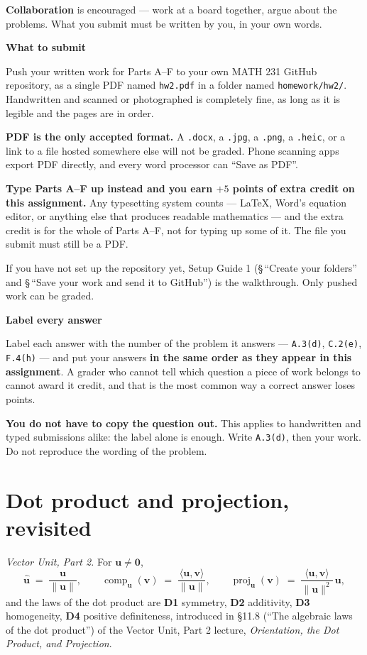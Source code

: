 \documentclass[11pt]{article}
\newcounter{prob}[section]
\newenvironment{callout}[1]
  {\par\medskip\needspace{5\baselineskip}%
   \begin{lrbox}{\qcbox}%
   \begin{minipage}{\dimexpr\textwidth-2\fboxsep-4pt}%
   \setlength{\parskip}{0.4em}%
   \textbf{\sffamily\color{RoyalBlue}#1}\par}
  {\end{minipage}\end{lrbox}%
   \begin{center}\colorbox{softbg}{\usebox{\qcbox}}\end{center}\medskip}
\newcommand{\vc}[1]{\mathbf{#1}}
\newcommand{\uv}[1]{\hat{\vc{#1}}}
\newcommand{\norm}[1]{\lVert #1\rVert}
\newcommand{\ip}[2]{\langle #1,#2\rangle}
\newcommand{\proj}[2]{\operatorname{proj}_{#1}(#2)}
\newcommand{\comp}[2]{\operatorname{comp}_{#1}(#2)}
\begin{document}
\medskip
\noindent\textbf{Collaboration} is encouraged --- work at a board together, argue
about the problems. What you submit must be written by you, in your own words.

\begin{callout}{What to submit}
Push your written work for Parts A--F to your own MATH 231 GitHub repository,
as a single PDF named \texttt{hw2.pdf} in a folder named \texttt{homework/hw2/}.
Handwritten and scanned or photographed is completely fine, as long as it is
legible and the pages are in order.

\textbf{PDF is the only accepted format.} A \texttt{.docx}, a \texttt{.jpg}, a
\texttt{.png}, a \texttt{.heic}, or a link to a file hosted somewhere else will
not be graded. Phone scanning apps export PDF directly, and every word processor
can ``Save as PDF''.

\textbf{Type Parts A--F up instead and you earn $+5$ points of extra credit on
this assignment.} Any typesetting system counts --- \LaTeX, Word's equation
editor, or anything else that produces readable mathematics --- and the extra
credit is for the whole of Parts A--F, not for typing up some of it. The file
you submit must still be a PDF.

If you have not set up the repository yet, Setup Guide 1 (\S\,``Create your
folders'' and \S\,``Save your work and send it to GitHub'') is the walkthrough.
Only pushed work can be graded.
\end{callout}

\begin{callout}{Label every answer}
Label each answer with the number of the problem it answers --- \texttt{A.3(d)},
\texttt{C.2(e)}, \texttt{F.4(h)} --- and put your answers \textbf{in the same
order as they appear in this assignment}. A grader who cannot tell which
question a piece of work belongs to cannot award it credit, and that is the most
common way a correct answer loses points.

\textbf{You do not have to copy the question out.} This applies to handwritten
and typed submissions alike: the label alone is enough. Write \texttt{A.3(d)},
then your work. Do not reproduce the wording of the problem.
\end{callout}

\section{Dot product and projection, revisited}
\emph{Vector Unit, Part 2.} For $\vc{u}\neq\vc{0}$,
\[
  \uv{u} \;=\; \frac{\vc{u}}{\norm{\vc{u}}},
  \qquad
  \comp{\vc{u}}{\vc{v}} \;=\; \frac{\ip{\vc{u}}{\vc{v}}}{\norm{\vc{u}}},
  \qquad
  \proj{\vc{u}}{\vc{v}} \;=\; \frac{\ip{\vc{u}}{\vc{v}}}{\norm{\vc{u}}^{2}}\,\vc{u} ,
\]
and the laws of the dot product are \textbf{D1} symmetry, \textbf{D2}
additivity, \textbf{D3} homogeneity, \textbf{D4} positive definiteness,
introduced in \S11.8 (``The algebraic laws of the dot product'') of the Vector
Unit, Part 2 lecture, \emph{Orientation, the Dot Product, and Projection}.
\end{document}
